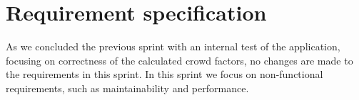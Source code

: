 \section{Requirement specification} \label{sec:s4_reqs}
As we concluded the previous sprint with an internal test of the application, focusing on correctness of the calculated crowd factors, no changes are made to the requirements in this sprint. In this sprint we focus on non-functional requirements, such as maintainability and performance. 




